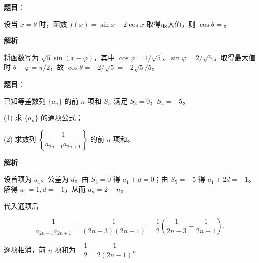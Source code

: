 \begin{answer}

\textbf{题目}：

设当 $x=\theta$ 时，函数 $f(x)=\sin x-2\cos x$ 取得最大值，则 $\cos\theta=$\gkblank{}。

\textbf{解析}

将函数写为 $\sqrt5\sin(x-\varphi)$，其中 $\cos\varphi=1/\sqrt5$、$\sin\varphi=2/\sqrt5$。取得最大值时 $\theta-\varphi=\pi/2$，故 $\cos\theta=-2/\sqrt5=-2\sqrt5/5$。


\end{answer}

\begin{answer}

\textbf{题目}：

已知等差数列 $\{a_n\}$ 的前 $n$ 项和 $S_n$ 满足 $S_3=0$，$S_5=-5$。

(1) 求 $\{a_n\}$ 的通项公式；

(2) 求数列 $\left\{\dfrac{1}{a_{2n-1}a_{2n+1}}\right\}$ 的前 $n$ 项和。

\textbf{解析}


设首项为 $a_1$、公差为 $d$。由 $S_3=0$ 得 $a_1+d=0$；由 $S_5=-5$ 得 $a_1+2d=-1$。解得 $a_1=1,d=-1$，从而 $a_n=2-n$。


代入通项后

\nopagebreak[4]
\[
\frac1{a_{2n-1}a_{2n+1}}
=\frac1{(2n-3)(2n-1)}
=\frac12\left(\frac1{2n-3}-\frac1{2n-1}\right).
\]

逐项相消，前 $n$ 项和为 $-\dfrac12-\dfrac1{2(2n-1)}$。



\end{answer}
